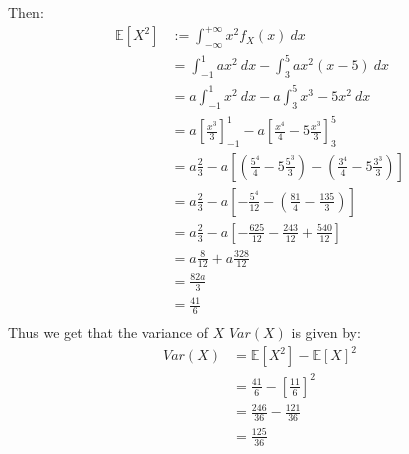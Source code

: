 \documentclass{article}
\newcommand{\E}{\mathbb{E}}
\begin{document}
Then:
\begin{align*}
    \E[X^2]
     & := \int_{-\infty}^{+\infty} x^2 f_X(x) \ dx                                                                                      \\
     & = \int_{-1}^{1} ax^2 \ dx - \int_{3}^{5} ax^2(x-5) \ dx                                                                          \\
     & = a \int_{-1}^{1} x^2 \ dx - a \int_{3}^{5} x^3 - 5x^2 \ dx                                                                      \\
     & = a \left[\frac{x^3}{3}\right]_{-1}^{1} - a \left[ \frac{x^4}{4} - 5\frac{x^3}{3} \right]_{3}^{5}                                \\
     & = a \frac{2}{3} - a \left[ \left( \frac{5^4}{4} - 5\frac{5^3}{3} \right) - \left( \frac{3^4}{4} - 5\frac{3^3}{3} \right) \right] \\
     & = a \frac{2}{3} - a \left[ - \frac{5^4}{12} - \left( \frac{81}{4} - \frac{135}{3} \right) \right]                                \\
     & = a \frac{2}{3} - a \left[ - \frac{625}{12} - \frac{243}{12} + \frac{540}{12} \right]                                            \\
     & = a \frac{8}{12} + a \frac{328}{12}                                                                                              \\
     & = \frac{82a}{3}                                                                                                                  \\
     & = \frac{41}{6}                                                                                                                   \\
\end{align*}
Thus we get that the variance of \(X\) \(Var(X)\) is given by:
\begin{align*}
    Var(X)
     & = \E[X^2] - \E[X]^2                            \\
     & = \frac{41}{6} - \left[ \frac{11}{6} \right]^2 \\
     & = \frac{246}{36} - \frac{121}{36}              \\
     & = \frac{125}{36}                               \\
\end{align*}
\end{document}
